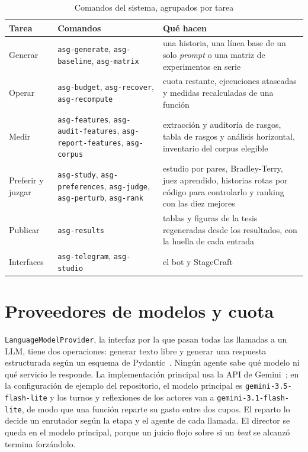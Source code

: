\begin{table}[htb]
  \centering
  \caption{Comandos del sistema, agrupados por tarea}
  \label{tab:comandos}
  \small
  \begin{tabular}{@{}>{\raggedright\arraybackslash}p{2.2cm}>{\raggedright\arraybackslash}p{4.4cm}%
      >{\raggedright\arraybackslash}p{7.2cm}@{}}
    \toprule
    Tarea & Comandos & Qué hacen \\
    \midrule
    Generar & \texttt{asg-generate}, \texttt{asg-baseline}, \texttt{asg-matrix} & una historia,
      una línea base de un solo \textit{prompt} o una matriz de experimentos en serie \\
    Operar & \texttt{asg-budget}, \texttt{asg-recover}, \texttt{asg-recompute} & cuota restante,
      ejecuciones atascadas y medidas recalculadas de una función \\
    Medir & \texttt{asg-features}, \texttt{asg-audit-features}, \texttt{asg-report-features},
      \texttt{asg-corpus} & extracción y auditoría de rasgos, tabla de rasgos y análisis
      horizontal, inventario del corpus elegible \\
    Preferir y juzgar & \texttt{asg-study}, \texttt{asg-preferences}, \texttt{asg-judge},
      \texttt{asg-perturb}, \texttt{asg-rank} & estudio por pares, Bradley-Terry, juez aprendido,
      historias rotas por código para controlarlo y ranking con las diez mejores \\
    Publicar & \texttt{asg-results} & tablas y figuras de la tesis regeneradas desde los
      resultados, con la huella de cada entrada \\
    Interfaces & \texttt{asg-telegram}, \texttt{asg-studio} & el bot y StageCraft \\
    \bottomrule
  \end{tabular}
\end{table}

\section{Proveedores de modelos y cuota}\label{sec:proveedores}

\texttt{LanguageModelProvider}, la interfaz por la que pasan todas las llamadas a un LLM, tiene dos
operaciones: generar texto libre y generar una respuesta estructurada según un esquema de
Pydantic~\cite{pydantic2026}. Ningún agente sabe qué modelo ni qué servicio le responde. La
implementación principal usa la API de Gemini~\cite{google2026}; en la configuración de ejemplo del
repositorio, el modelo principal es \texttt{gemini-3.5-flash-lite} y los turnos y reflexiones de los
actores van a \texttt{gemini-3.1-flash-lite}, de modo que una función reparte su gasto entre dos
cupos. El reparto lo decide un enrutador según la etapa y el agente de cada llamada. El director se
queda en el modelo principal, porque un juicio flojo sobre si un \textit{beat} se alcanzó termina
forzándolo.

